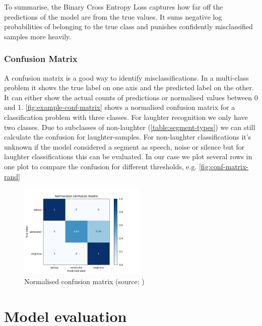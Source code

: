 \documentclass[bsc,frontabs,parskip,deptreport]{infthesis}
\begin{document}
To summarise, the Binary Cross Entropy Loss captures how far off the predictions of the model are from the true values. It sums negative log probabilities of belonging to the true class and punishes confidently misclassified samples more heavily.

\subsection{Confusion Matrix} \label{sec:conf-matrix}
A confusion matrix is a good way to identify misclassifications. In a multi-class problem it shows the true label on one axis and the predicted label on the other. It can either show the actual counts of predictions or normalised values between 0 and 1. \autoref{fig:example-conf-matrix} shows a normalised confusion matrix for a classification problem with three classes.
For laughter recognition we only have two classes. Due to subclasses of non-laughter (\autoref{table:segment-types}) we can still calculate the confusion for laughter-samples. For non-laughter classifications it's unknown if the model considered a segment as speech, noise or silence but for laughter classifications this can be evaluated. In our case we plot several rows in one plot to compare the confusion for different thresholds, e.g. \autoref{fig:conf-matrix-rand}
\begin{figure}
    \centering
    \includegraphics[width=6cm]{imgs/examples/exmaple_confusion_matrix.png}
    \caption{Normalised confusion matrix (source: \citeauthor{confmatrixscikit})}
    \label{fig:example-conf-matrix}
\end{figure}

\chapter{Model evaluation} \label{cha:model-evaluation}
\end{document}
